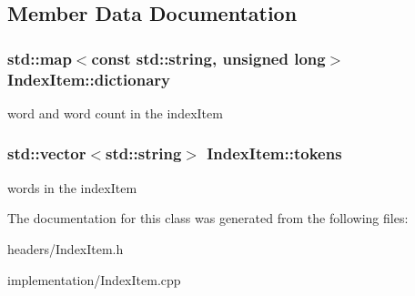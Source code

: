 \subsection{Member Data Documentation}
\hypertarget{classIndexItem_a667ce7eb5e6f22b032dcacd042d89cd3}{
\subsubsection[{dictionary}]{\setlength{\rightskip}{0pt plus 5cm}std\-::map$<$const std\-::string, unsigned long$>$ Index\-Item\-::dictionary\hspace{0.3cm}{\ttfamily [protected]}}}\label{classIndexItem_a667ce7eb5e6f22b032dcacd042d89cd3}
word and word count in the index\-Item \hypertarget{classIndexItem_a36ee76ec7176493ed48952d6231c29f2}{
\subsubsection[{tokens}]{\setlength{\rightskip}{0pt plus 5cm}std\-::vector$<$std\-::string$>$ Index\-Item\-::tokens\hspace{0.3cm}{\ttfamily [protected]}}}\label{classIndexItem_a36ee76ec7176493ed48952d6231c29f2}
words in the index\-Item 

The documentation for this class was generated from the following files\-:\begin{DoxyCompactItemize}
\item 
headers/Index\-Item.\-h\item 
implementation/Index\-Item.\-cpp\end{DoxyCompactItemize}
